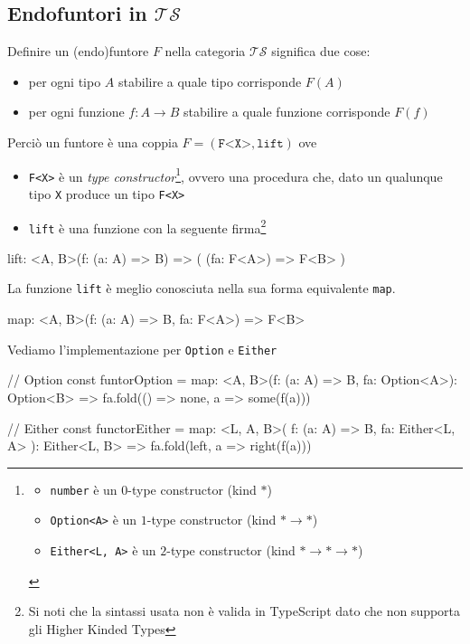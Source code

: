 \documentclass[12pt]{article}
\theoremstyle{definition}
\newenvironment{code}
  {\vspace{0.5cm} \VerbatimEnvironment\begin{typescriptcode}}
  {\end{typescriptcode} \vspace{0.2cm}}
\begin{document}
\subsection{Endofuntori in $\mathcal{TS}$}

Definire un (endo)funtore $F$ nella categoria $\mathcal{TS}$ significa due cose:

\begin{itemize}
  \item per ogni tipo $A$ stabilire a quale tipo corrisponde $F(A)$
  \item per ogni funzione $f: A \rightarrow B$ stabilire a quale funzione corrisponde $F(f)$
\end{itemize}

Perciò un funtore è una coppia $F = (\texttt{F<X>}, \texttt{lift})$ ove

\begin{itemize}
  \item \texttt{F<X>} è un \emph{type constructor}\footnote{
    \begin{itemize}
      \item \texttt{number} è un $0$-type constructor (kind $*$)
      \item \texttt{Option<A>} è un $1$-type constructor (kind $* \rightarrow *$)
      \item \texttt{Either<L, A>} è un $2$-type constructor (kind $* \rightarrow * \rightarrow *$)
    \end{itemize}
  }, ovvero una procedura che, dato un qualunque tipo \texttt{X} produce un tipo \texttt{F<X>}
  \item \texttt{lift} è una funzione con la seguente firma\footnote{Si noti che la sintassi usata non è valida in TypeScript dato che non supporta gli Higher Kinded Types}
\end{itemize}

\begin{code}
lift: <A, B>(f: (a: A) => B) => ( (fa: F<A>) => F<B> )
\end{code}

La funzione \texttt{lift} è meglio conosciuta nella sua forma equivalente \texttt{map}.

\begin{code}
map: <A, B>(f: (a: A) => B, fa: F<A>) => F<B>
\end{code}

Vediamo l'implementazione per \texttt{Option} e \texttt{Either}

\begin{code}
// Option
const funtorOption = {
  map: <A, B>(f: (a: A) => B, fa: Option<A>): Option<B> =>
    fa.fold(() => none, a => some(f(a)))
}

// Either
const functorEither = {
  map: <L, A, B>(
    f: (a: A) => B,
    fa: Either<L, A>
  ): Either<L, B> => fa.fold(left, a => right(f(a)))
}
\end{code}
\end{document}
